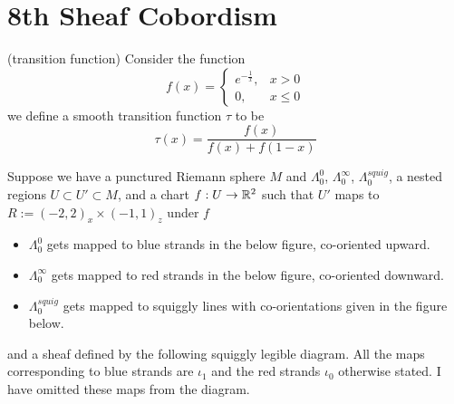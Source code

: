 \section{8th Sheaf Cobordism}
\begin{definition}
(transition function) Consider the function
\[
f(x) =
\begin{cases}
e^{-\frac{1}{x}}, & x > 0 \\
0, & x \leq 0
\end{cases}
\]
we define a smooth transition function $\tau$ to be
\[
\tau(x) = \frac{f(x)}{f(x)+f(1-x)}
\]
\end{definition}

Suppose we have a punctured Riemann sphere $M$ and $\Lambda_0^0$, $\Lambda_0^\infty$, $\Lambda_0^{squig}$, a nested regions $U\subset U' \subset M$, and a chart $f : U \rightarrow \mathbb{R}^2$ such that $U'$ maps to $R:=(-2,2)_x \times (-1,1)_z$ under $f$
\begin{itemize}
\item $\Lambda_0^0$ gets mapped to blue strands in the below figure, co-oriented upward.

\item $\Lambda_0^\infty$ gets mapped to red strands in the below figure, co-oriented downward.

\item $\Lambda_0^{squig}$ gets mapped to squiggly lines with co-orientations given in the figure below.
\end{itemize}
and a sheaf defined by the following squiggly legible diagram. All the maps corresponding to blue strands are $\iota_1$ and the red strands $\iota_0$ otherwise stated. I have omitted these maps from the diagram.\\

